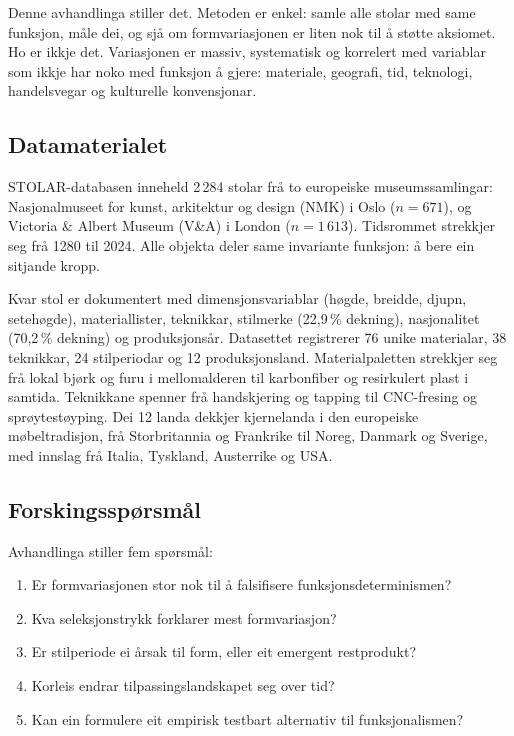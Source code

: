 \documentclass[10pt, a4paper, twocolumn]{article}
\begin{document}
Denne avhandlinga stiller det. Metoden er enkel: samle alle stolar med same funksjon, måle dei, og sjå om formvariasjonen er liten nok til å støtte aksiomet. Ho er ikkje det. Variasjonen er massiv, systematisk og korrelert med variablar som ikkje har noko med funksjon å gjere: materiale, geografi, tid, teknologi, handelsvegar og kulturelle konvensjonar.

\subsection{Datamaterialet}

STOLAR-databasen inneheld 2\,284 stolar frå to europeiske museumssamlingar: Nasjonalmuseet for kunst, arkitektur og design (NMK) i Oslo ($n = 671$), og Victoria \& Albert Museum (V\&A) i London ($n = 1\,613$). Tidsrommet strekkjer seg frå 1280 til 2024. Alle objekta deler same invariante funksjon: å bere ein sitjande kropp.

Kvar stol er dokumentert med dimensjonsvariablar (høgde, breidde, djupn, setehøgde), materiallister, teknikkar, stilmerke (22,9\,\% dekning), nasjonalitet (70,2\,\% dekning) og produksjonsår. Datasettet registrerer 76 unike materialar, 38 teknikkar, 24 stilperiodar og 12 produksjonsland. Materialpaletten strekkjer seg frå lokal bjørk og furu i mellomalderen til karbonfiber og resirkulert plast i samtida. Teknikkane spenner frå handskjering og tapping til CNC-fresing og sprøytestøyping. Dei 12 landa dekkjer kjernelanda i den europeiske møbeltradisjon, frå Storbritannia og Frankrike til Noreg, Danmark og Sverige, med innslag frå Italia, Tyskland, Austerrike og USA.

\subsection{Forskingsspørsmål}

Avhandlinga stiller fem spørsmål:
\begin{enumerate}
  \item Er formvariasjonen stor nok til å falsifisere funksjonsdeterminismen?
  \item Kva seleksjonstrykk forklarer mest formvariasjon?
  \item Er stilperiode ei årsak til form, eller eit emergent restprodukt?
  \item Korleis endrar tilpassingslandskapet seg over tid?
  \item Kan ein formulere eit empirisk testbart alternativ til funksjonalismen?
\end{enumerate}
\end{document}
